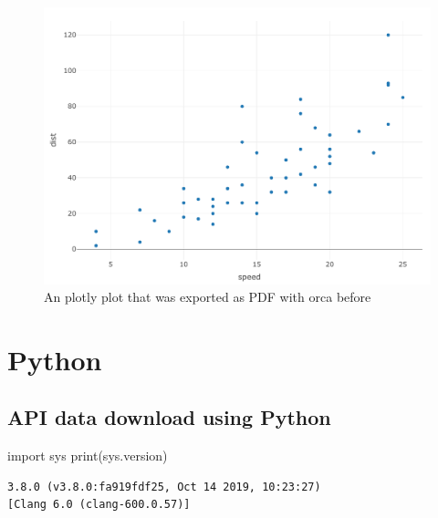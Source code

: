 \documentclass[
  12pt,
]{article}
\newenvironment{Shaded}{\begin{snugshade}}{\end{snugshade}}
\newcommand{\BuiltInTok}[1]{#1}
\newcommand{\ImportTok}[1]{#1}
\newcommand{\NormalTok}[1]{#1}
\begin{document}
\begin{figure}[ht]
\centering
\caption{An plotly plot that was exported as PDF with orca before}\label{fig:fig-3}
        \includegraphics[width=0.9\linewidth]{logs/plotly-plot.pdf}
\begin{flushleft}
\end{flushleft}
\end{figure}
\vspace{-1.2cm}

\hypertarget{python}{%
\section{Python}\label{python}}

\hypertarget{api-data-download-using-python}{%
\subsection{API data download using Python}\label{api-data-download-using-python}}

\begin{Shaded}
\begin{Highlighting}[]
\ImportTok{import}\NormalTok{ sys}
\BuiltInTok{print}\NormalTok{(sys.version)}
\end{Highlighting}
\end{Shaded}

\begin{verbatim}
3.8.0 (v3.8.0:fa919fdf25, Oct 14 2019, 10:23:27) 
[Clang 6.0 (clang-600.0.57)]
\end{verbatim}
\end{document}

